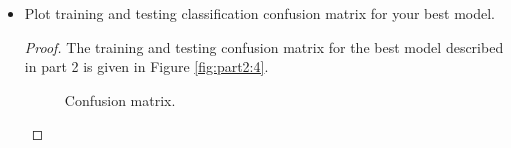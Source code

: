 \documentclass[11pt]{article}
\newcommand{\1}{\mathbf{1}}
\begin{document}
{\begin{itemize}
\begin{proof}
\begin{figure}[htbp]
    \caption{Running time versus batch sizes. \label{fig:part2:3}}
    \end{figure}
  \end{proof}
  \item Plot training and testing classification confusion matrix for your best model.
  \begin{proof}
    The training and testing confusion matrix for the best model described in part 2 is given in Figure \ref{fig:part2:4}.
    \begin{figure}[htbp]
    \centering
    \caption{Confusion matrix. \label{fig:part2:3}}
    \end{figure}
  \end{proof}
\end{itemize}

}
\end{document}
